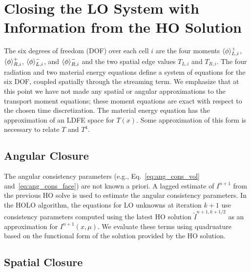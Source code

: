 \section{Closing the LO System with Information from the HO Solution}
\label{sec:closure}

The six degrees of freedom (DOF) over each cell $i$ are the four moments $\langle \phi \rangle_{L,i}^+$,
$\langle \phi \rangle_{R,i}^+$, $\langle \phi \rangle_{L,i}^-$, and $\langle \phi \rangle_{R,i}^-$ and the two
spatial edge values $T_{L,i}$ and $T_{R,i}$. The four radiation and two material
energy equations define a system of equations for the six DOF, coupled spatially through
the streaming term.  We emphasize that at this point we have not made any spatial or
angular approximations to the transport moment equations; these moment equations are exact with
respect to the chosen time discretization.  The material energy equation has the
approximation of an LDFE space for $T(x)$.  Some approximation of this form is necessary
to relate $T$ and $T^4$.

\subsection{Angular Closure}

The angular consistency
parameters (e.g., Eq.~\eqref{eq:ang_cons_vol} and~\eqref{eq:ang_cons_face}) are not known a priori. 
A lagged estimate of $I^{n+1}$ from the previous HO solve is
used to estimate the angular consistency parameters. In the HOLO algorithm, the equations for LO unknowns at iteration $k+1$ use consistency parameters
computed using the latest HO solution $\tilde{I}^{n+1,k+1/2}$
as an approximation for $I^{n+1}(x,\mu)$.  We evaluate these terms using quadruature based
on the functional form of the solution provided by the HO solution.

\subsection{Spatial Closure}

